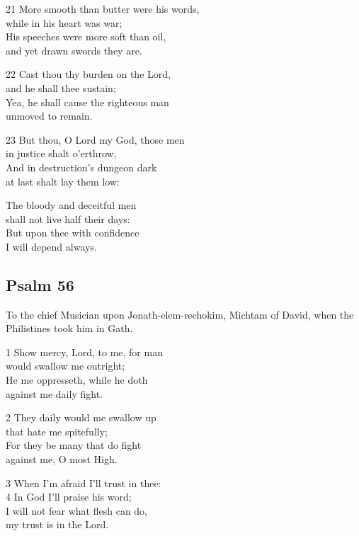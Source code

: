 \begin{multicols}{3}
21 More smooth than butter were his words,\\
while in his heart was war;\\
His speeches were more soft than oil,\\
and yet drawn swords they are.

22 Cast thou thy burden on the Lord,\\
and he shall thee sustain;\\
Yea, he shall cause the righteous man\\
unmoved to remain.

23 But thou, O Lord my God, those men\\
in justice shalt o’erthrow,\\
And in destruction’s dungeon dark\\
at last shalt lay them low:

The bloody and deceitful men\\
shall not live half their days:\\
But upon thee with confidence\\
I will depend always.

\begin{center}
\quad{}\quad{}
\end{center}

\subsection*{Psalm 56}


To the chief Musician upon Jonath-elem-rechokim, Michtam of David, when the Philistines took him in Gath.

1 Show mercy, Lord, to me, for man\\
would swallow me outright;\\
He me oppresseth, while he doth\\
against me daily fight.

2 They daily would me swallow up\\
that hate me spitefully;\\
For they be many that do fight\\
against me, O most High.

3 When I’m afraid I’ll trust in thee:\\
4 In God I’ll praise his word;\\
I will not fear what flesh can do,\\
my trust is in the Lord.


\end{multicols}
